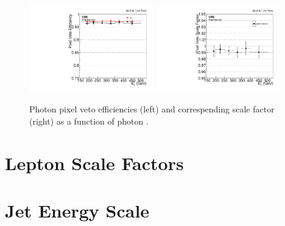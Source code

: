 \begin{figure}[htbp]
  \begin{center}
    \includegraphics[width=0.48\textwidth]{Calibration/Figures/pvsf/efficiency_barrel_medium.pdf}
    \includegraphics[width=0.48\textwidth]{Calibration/Figures/pvsf/scalefactor_barrel_medium.pdf}
    \caption{
      Photon pixel veto efficiencies (left) and correspending scale factor (right) as a function of photon \pt.
    }
    \label{fig:pvsf_results}
  \end{center}
\end{figure}

\section{Lepton Scale Factors}

\section{Jet Energy Scale}
